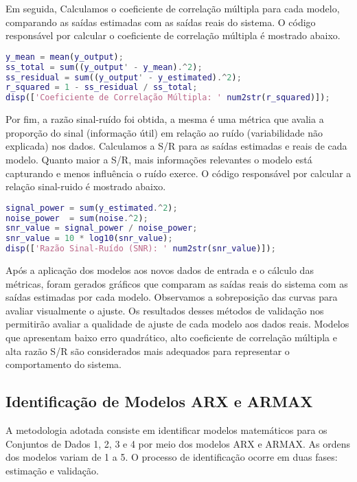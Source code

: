 \documentclass[a4paper,12pt]{article}
\begin{document}
Em seguida, Calculamos o coeficiente de correlação múltipla para cada modelo, comparando as saídas estimadas com as saídas reais do sistema. O código responsável por calcular o coeficiente de correlação múltipla é mostrado abaixo.
\begin{lstlisting}[language=Matlab, caption=Calculo do coeficiente de correlação multipla.]
% Cálculo do coeficiente de correlação múltipla
y_mean = mean(y_output);
ss_total = sum((y_output' - y_mean).^2);
ss_residual = sum((y_output' - y_estimated).^2);
r_squared = 1 - ss_residual / ss_total;
disp(['Coeficiente de Correlação Múltipla: ' num2str(r_squared)]);
\end{lstlisting}

Por fim, a razão sinal-ruído foi obtida, a mesma é uma métrica que avalia a proporção do sinal (informação útil) em relação ao ruído (variabilidade não explicada) nos dados. Calculamos a S/R para as saídas estimadas e reais de cada modelo. Quanto maior a S/R, mais informações relevantes o modelo está capturando e menos influência o ruído exerce. O código responsável por calcular a relação sinal-ruido é mostrado abaixo.
\begin{lstlisting}[language=Matlab, caption=Calculo da relação sinal-ruido.]
% Cálculo razão sinal-ruido
signal_power = sum(y_estimated.^2);
noise_power  = sum(noise.^2);
snr_value = signal_power / noise_power;
snr_value = 10 * log10(snr_value);
disp(['Razão Sinal-Ruído (SNR): ' num2str(snr_value)]);
\end{lstlisting}

Após a aplicação dos modelos aos novos dados de entrada e o cálculo das métricas, foram gerados gráficos que comparam as saídas reais do sistema com as saídas estimadas por cada modelo. Observamos a sobreposição das curvas para avaliar visualmente o ajuste. Os resultados desses métodos de validação nos permitirão avaliar a qualidade de ajuste de cada modelo aos dados reais. Modelos que apresentam baixo erro quadrático, alto coeficiente de correlação múltipla e alta razão S/R são considerados mais adequados para representar o comportamento do sistema.

\subsection{Identificação de Modelos ARX e ARMAX}\label{3.7}

A metodologia adotada consiste em identificar modelos matemáticos para os Conjuntos de Dados 1, 2, 3 e 4 por meio dos modelos ARX e ARMAX. As ordens dos modelos variam de 1 a 5. O processo de identificação ocorre em duas fases: estimação e validação.
\end{document}
